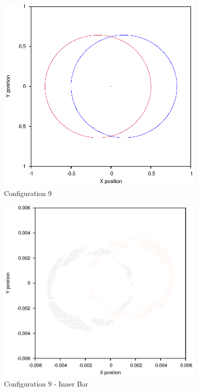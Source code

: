 \documentclass[a4paper,12pt]{article}
\begin{document}
\begin{figure}[H]
\centering
\includegraphics[width=0.9\textwidth]{./results/005-58-005-35/Orbit.eps}
\caption{Configuration 9}
\label{fig:config9}
\end{figure}
\begin{figure}[H]
\centering
\includegraphics[width=0.9\textwidth]{./results/005-58-005-35/Inner.eps}
\caption{Configuration 9 - Inner Bar}
\label{fig:config9i}
\end{figure}
\end{document}
